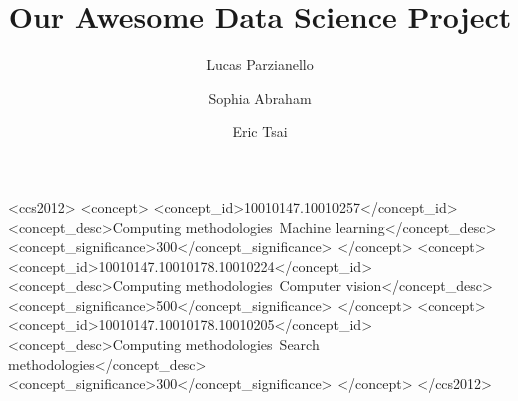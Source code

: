 \title[Data Science Project]{Our Awesome Data Science Project}


\author{Lucas Parzianello}

\author{Sophia Abraham}

\author{Eric Tsai}

\renewcommand{\shortauthors}{Parzianello, Abraham, and Tsai.}

\begin{abstract}
  \lipsum[1]
\end{abstract}

\begin{CCSXML}
<ccs2012>
<concept>
<concept_id>10010147.10010257</concept_id>
<concept_desc>Computing methodologies~Machine learning</concept_desc>
<concept_significance>300</concept_significance>
</concept>
<concept>
<concept_id>10010147.10010178.10010224</concept_id>
<concept_desc>Computing methodologies~Computer vision</concept_desc>
<concept_significance>500</concept_significance>
</concept>
<concept>
<concept_id>10010147.10010178.10010205</concept_id>
<concept_desc>Computing methodologies~Search methodologies</concept_desc>
<concept_significance>300</concept_significance>
</concept>
</ccs2012>
\end{CCSXML}

